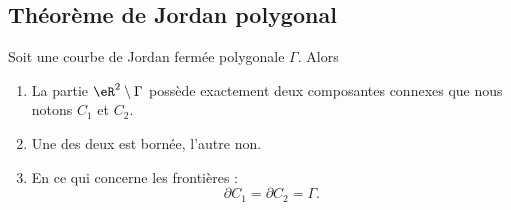 \subsection{Théorème de Jordan polygonal}

\begin{proposition}	\label{PROPooDZRMooJfAKuS}
	Soit une courbe de Jordan fermée polygonale \( \Gamma\). Alors
	\begin{enumerate}
		\item		\label{ITEMooCQMUooYyIdRs}
		      La partie \( \eR^2\setminus \Gamma\) possède exactement deux composantes connexes que nous notons \( C_1\) et \( C_2\).
		\item		\label{ITEMooYXJVooMRAbxg}
		      Une des deux est bornée, l'autre non.
		\item
		      En ce qui concerne les frontières :
		      \begin{equation}
			      \partial C_1=\partial C_2=\Gamma.
		      \end{equation}
	\end{enumerate}
\end{proposition}

